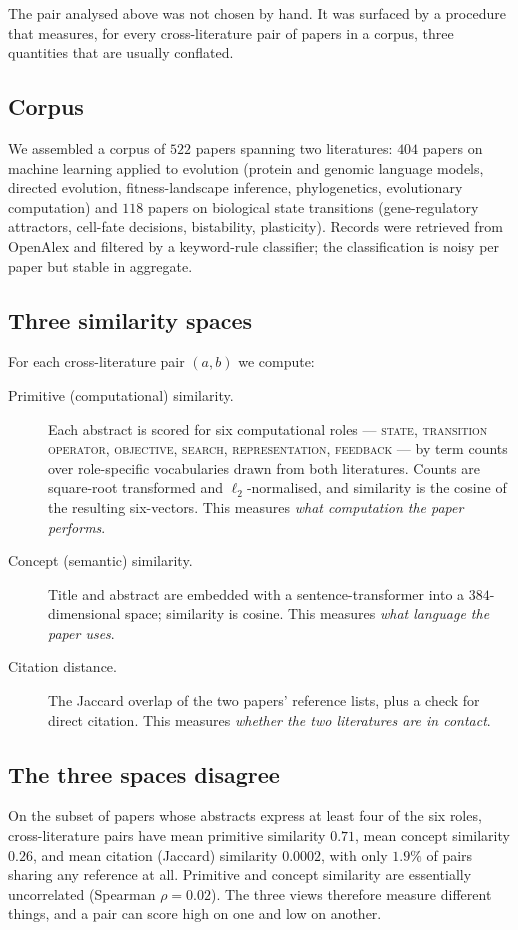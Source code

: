 \documentclass[11pt]{article}
\begin{document}
The pair analysed above was not chosen by hand. It was surfaced by a procedure that measures, for every
cross-literature pair of papers in a corpus, three quantities that are usually conflated.

\subsection{Corpus}
We assembled a corpus of $522$ papers spanning two literatures: $404$ papers on machine learning applied to
evolution (protein and genomic language models, directed evolution, fitness-landscape inference, phylogenetics,
evolutionary computation) and $118$ papers on biological state transitions (gene-regulatory attractors, cell-fate
decisions, bistability, plasticity). Records were retrieved from OpenAlex and filtered by a keyword-rule classifier;
the classification is noisy per paper but stable in aggregate.

\subsection{Three similarity spaces}
For each cross-literature pair $(a,b)$ we compute:
\begin{description}
\item[Primitive (computational) similarity.] Each abstract is scored for six computational roles --- \textsc{state},
\textsc{transition operator}, \textsc{objective}, \textsc{search}, \textsc{representation}, \textsc{feedback} ---
by term counts over role-specific vocabularies drawn from both literatures. Counts are square-root transformed and
$\ell_2$-normalised, and similarity is the cosine of the resulting six-vectors. This measures \emph{what computation
the paper performs}.
\item[Concept (semantic) similarity.] Title and abstract are embedded with a sentence-transformer into a $384$-
dimensional space; similarity is cosine. This measures \emph{what language the paper uses}.
\item[Citation distance.] The Jaccard overlap of the two papers' reference lists, plus a check for direct citation.
This measures \emph{whether the two literatures are in contact}.
\end{description}

\subsection{The three spaces disagree}
On the subset of papers whose abstracts express at least four of the six roles, cross-literature pairs have mean
primitive similarity $0.71$, mean concept similarity $0.26$, and mean citation (Jaccard) similarity $0.0002$, with
only $1.9\%$ of pairs sharing any reference at all. Primitive and concept similarity are essentially uncorrelated
(Spearman $\rho=0.02$). The three views therefore measure different things, and a pair can score high on one and low
on another.
\end{document}
